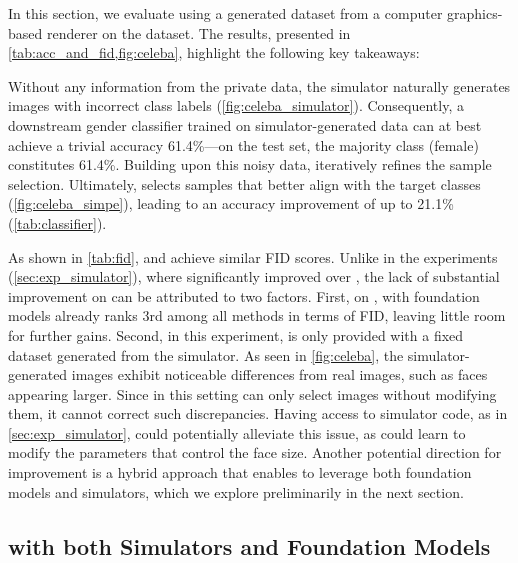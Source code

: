 In this section, we evaluate \simpe{} using a generated dataset from a computer graphics-based renderer on the \celeba{} dataset. The results, presented in \cref{tab:acc_and_fid,fig:celeba}, highlight the following key takeaways:

Without any information from the private data, the simulator naturally generates images with incorrect class labels (\cref{fig:celeba_simulator}). Consequently, a downstream gender classifier trained on simulator-generated data can at best achieve a trivial accuracy 61.4\%---on the test set, the majority class (female) constitutes 61.4\%. Building upon this noisy data, \simpe{} iteratively refines the sample selection. Ultimately, \simpe{} selects samples that better align with the target classes (\cref{fig:celeba_simpe}), leading to an accuracy improvement of up to 21.1\% (\cref{tab:classifier}).

 As shown in \cref{tab:fid}, \simpe{} and \pe{} achieve similar FID scores. Unlike in the \mnist{} experiments (\cref{sec:exp_simulator}), where \simpe{} significantly improved over \pe{}, the lack of substantial improvement on \celeba{} can be attributed to two factors. First, on \celeba{}, \pe{} with foundation models already ranks 3rd among all methods in terms of FID, leaving little room for further gains. Second, in this experiment, \simpe{} is only provided with a fixed dataset generated from the simulator. As seen in \cref{fig:celeba}, the simulator-generated images exhibit noticeable differences from real \celeba{} images, such as faces appearing larger. Since \simpe{} in this setting can only select images without modifying them, it cannot correct such discrepancies. Having access to simulator code, as in \cref{sec:exp_simulator}, could potentially alleviate this issue, as \simpe{} could learn to modify the parameters that control the face size.
Another potential direction for improvement is a hybrid approach that enables \pe{} to leverage both foundation models and simulators, which we explore preliminarily in the next section.




\subsection{\simpe{} with both Simulators and Foundation Models}




